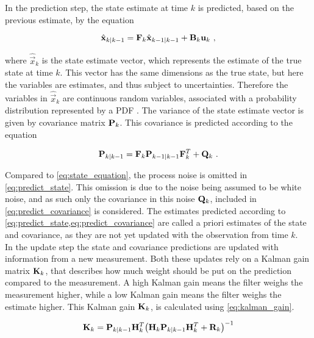 In the prediction step, the state estimate at time $k$ is predicted, based on the previous estimate, by the equation

\begin{equation}
\label{eq:predict_state}
  \hat{\mathbf{x}}_{k|k-1} = \mathbf{F}_k \hat{\mathbf{x}}_{k-1|k-1} + \mathbf{B}_k \mathbf{u}_k \text{ ,}
\end{equation}

where $\hat{\vec{x}}_k$ is the state estimate vector, which represents the estimate of the true state at time $k$. This vector has the same dimensions as the true state, but here the variables are estimates, and thus subject to uncertainties. Therefore the variables in $\hat{\vec{x}}_k$ are continuous random variables, associated with a probability distribution represented by a PDF . The variance of the state estimate vector is given by covariance matrix $\mathbf{P}_k$. This covariance is predicted according to the equation 

\begin{equation}
\label{eq:predict_covariance}
  \mathbf{P}_{k|k-1} = \mathbf{F}_k \mathbf{P}_{k-1|k-1} \mathbf{F}_k^T + \mathbf{Q}_k \text{ .}
\end{equation}

Compared to \cref{eq:state_equation}, the process noise is omitted in \cref{eq:predict_state}. This omission is due to the noise being assumed to be white noise, and as such only the covariance in this noise $\mathbf{Q}_k$, included in \cref{eq:predict_covariance} is considered. The estimates predicted according to \cref{eq:predict_state,eq:predict_covariance} are called a priori estimates of the state and covariance, as they are not yet updated with the observation from time $k$. \\

In the update step the state and covariance predictions are updated with information from a new measurement. Both these updates rely on a Kalman gain matrix $\mathbf{K}_k$, that describes how much weight should be put on the prediction compared to the measurement. A high Kalman gain means the filter weighs the measurement higher, while a low Kalman gain means the filter weighs the estimate higher. This Kalman gain $\mathbf{K}_k$, is calculated using \cref{eq:kalman_gain}.

\begin{equation}
\label{eq:kalman_gain}
 \mathbf{K}_k = \mathbf{P}_{k|k-1} \mathbf{H}_k^T \big(\mathbf{H}_k \mathbf{P}_{k|k-1} \mathbf{H}_k^T + \mathbf{R}_k \big)^{-1}
\end{equation}

